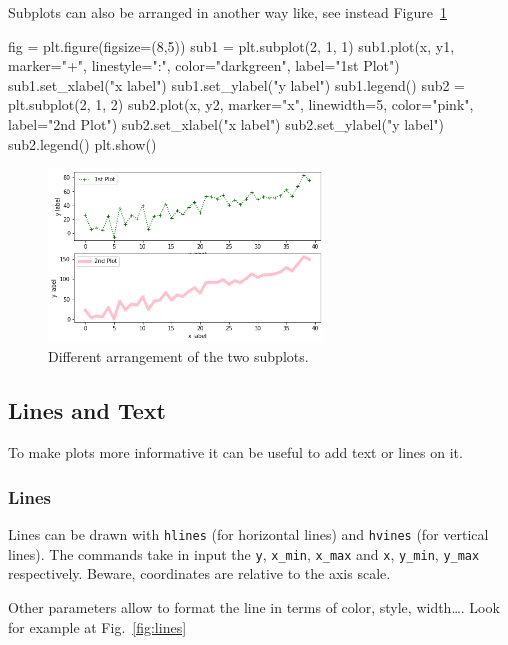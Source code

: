 Subplots can also be arranged in another way like, see instead Figure~\ref{fig:subplot2}

\begin{ipython}
fig = plt.figure(figsize=(8,5))
sub1 = plt.subplot(2, 1, 1)
sub1.plot(x, y1, marker="+", linestyle=":", color="darkgreen", label="1st Plot")
sub1.set_xlabel("x label")
sub1.set_ylabel("y label")
sub1.legend()
sub2 = plt.subplot(2, 1, 2)
sub2.plot(x, y2, marker="x", linewidth=5, color="pink", label="2nd Plot")
sub2.set_xlabel("x label")
sub2.set_ylabel("y label")
sub2.legend()
plt.show()
\end{ipython}

\begin{figure}[h]
	\centering
	\includegraphics[width=0.65\textwidth]{figures/subplot2}
	\caption{Different arrangement of the two subplots.}
	\label{fig:subplot2}
\end{figure}

\subsection{Lines and Text}\label{lines-and-text}

To make plots more informative it can be useful to add text or lines on it.

\subsubsection{Lines}\label{lines}

Lines can be drawn with \texttt{hlines} (for horizontal lines) and
\texttt{hvines} (for vertical lines). The commands take in input the \texttt{y}, \texttt{x\_min}, \texttt{x\_max} and \texttt{x}, \texttt{y\_min}, \texttt{y\_max} respectively. Beware, coordinates are relative to the axis scale.

Other parameters allow to format the line in terms of color, style, width\ldots. Look for example at Fig.~\ref{fig:lines}


